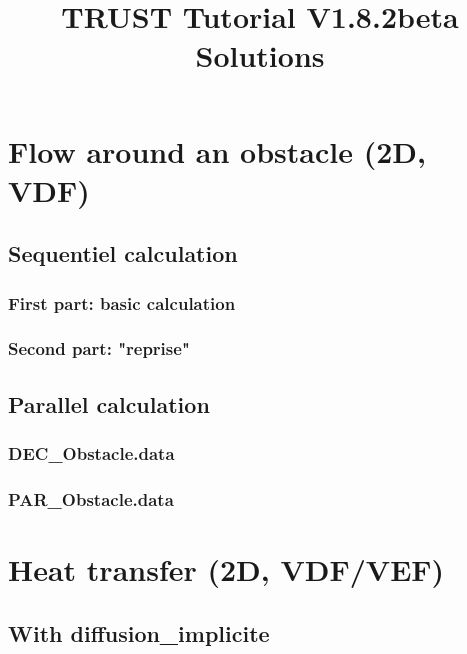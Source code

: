 \documentclass[english]{article}
\begin{document}
\title{TRUST Tutorial V1.8.2beta Solutions}
\maketitle
\tableofcontents{}
\newpage

\section{Flow around an obstacle (2D, VDF)}
\subsection{Sequentiel calculation}
\subsubsection{First part: basic calculation}

\subsubsection{Second part: "reprise"}


\subsection{Parallel calculation}
\subsubsection{DEC\_Obstacle.data}

\subsubsection{PAR\_Obstacle.data}



\section{Heat transfer (2D, VDF/VEF)}
\subsection{With diffusion\_implicite}

\end{document}
